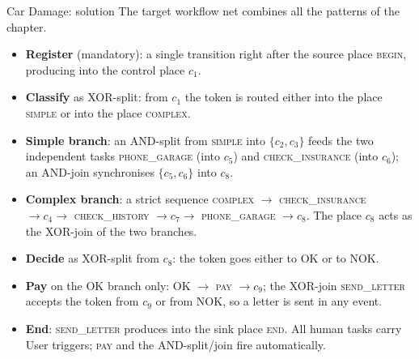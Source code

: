 \begin{examplebox}{Car Damage: solution}
The target workflow net combines all the patterns of the chapter.

\begin{itemize}
  \item \textbf{Register} (mandatory): a single transition right after the source place \textsc{begin}, producing into the control place $c_1$.
  \item \textbf{Classify} as XOR-split: from $c_1$ the token is routed either into the place \textsc{simple} or into the place \textsc{complex}.
  \item \textbf{Simple branch}: an AND-split from \textsc{simple} into $\{c_2, c_3\}$ feeds the two independent tasks \textsc{phone\_garage} (into $c_5$) and \textsc{check\_insurance} (into $c_6$); an AND-join synchronises $\{c_5, c_6\}$ into $c_8$.
  \item \textbf{Complex branch}: a strict sequence \textsc{complex} $\to$ \textsc{check\_insurance} $\to c_4 \to$ \textsc{check\_history} $\to c_7 \to$ \textsc{phone\_garage} $\to c_8$. The place $c_8$ acts as the XOR-join of the two branches.
  \item \textbf{Decide} as XOR-split from $c_8$: the token goes either to \textsc{OK} or to \textsc{NOK}.
  \item \textbf{Pay} on the OK branch only: \textsc{OK} $\to$ \textsc{pay} $\to c_9$; the XOR-join \textsc{send\_letter} accepts the token from $c_9$ or from \textsc{NOK}, so a letter is sent in any event.
  \item \textbf{End}: \textsc{send\_letter} produces into the sink place \textsc{end}. All human tasks carry User triggers; \textsc{pay} and the AND-split/join fire automatically.
\end{itemize}


\end{examplebox}
